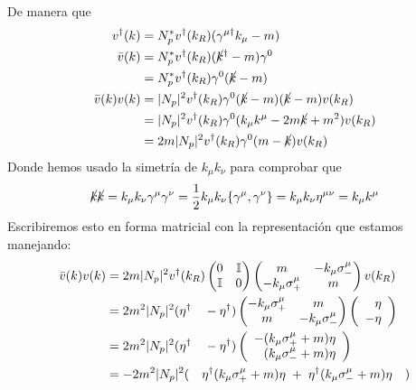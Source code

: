 De manera que
\begin{equation}\begin{split}
v^\dagger(k)&=N_p^*v^\dagger(k_R)(\gamma^{\mu\dagger}k_\mu-m)\\
\bar v(k)&=N_p^*v^\dagger(k_R)(\cancel k^\dagger-m)\gamma^0\\
&=N_p^*v^\dagger(k_R)\gamma^0(\cancel k-m)\\
\bar v(k)v(k)&=|N_p|^2v^\dagger(k_R)\gamma^0(\cancel k-m)(\cancel k-m)v(k_R)\\
&=|N_p|^2v^\dagger(k_R)\gamma^0(k_\mu k^\mu-2m\cancel k+m^2)v(k_R)\\
&=2m|N_p|^2v^\dagger(k_R)\gamma^0(m-\cancel k)v(k_R)\\
\end{split}\end{equation}
Donde hemos usado la simetría de $k_\mu k_\nu$ para comprobar que
\begin{equation}
\cancel k\cancel k
=k_\mu k_\nu\gamma^\mu\gamma^\nu
=\frac12k_\mu k_\nu\{\gamma^\mu,\gamma^\nu\}
=k_\mu k_\nu \eta^{\mu\nu}
=k_\mu k^\mu
\end{equation}
Escribiremos esto en forma matricial con la representación que estamos manejando:
\begin{equation}\begin{split}
\bar v(k)v(k)&=
2m|N_p|^2v^\dagger(k_R)
\begin{pmatrix}0&\id\\\id&0\end{pmatrix}
\begin{pmatrix}
m&-k_\mu\sigma_-^\mu\\
-k_\mu\sigma_+^\mu&m
\end{pmatrix}
v(k_R)\\
&=
2m^2|N_p|^2
(\eta^\dagger\quad-\eta^\dagger)
\begin{pmatrix}
-k_\mu\sigma_+^\mu&m\\
m&-k_\mu\sigma_-^\mu
\end{pmatrix}
\left(\begin{array}r\eta\\-\eta\end{array}\right)\\
&=
2m^2|N_p|^2
(\eta^\dagger\quad-\eta^\dagger)
\left(\begin{array}r
-(k_\mu\sigma_+^\mu+m)\eta\\
 (k_\mu\sigma_-^\mu+m)\eta
\end{array}\right)\\
&=
-2m^2|N_p|^2
(\quad
\eta^\dagger(k_\mu\sigma_+^\mu+m)\eta
\;+\;
\eta^\dagger(k_\mu\sigma_-^\mu+m)\eta
\quad)
\end{split}\end{equation}
